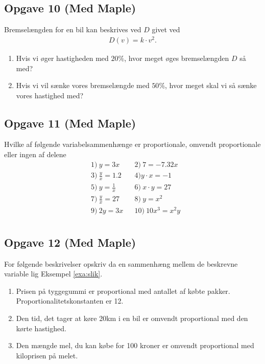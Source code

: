 \subsection*{Opgave 10 (Med Maple)}
Bremselængden for en bil kan beskrives ved $D$ givet ved
\begin{align*}
D(v) = k\cdot v^2.
\end{align*}
\begin{enumerate}[label=\roman*)]
\item Hvis vi øger hastigheden med $20\%$, hvor meget øges bremselængden $D$ så med?
\item Hvis vi vil sænke vores bremselængde med $50\%$, hvor meget skal vi så sænke vores hastighed med?
\end{enumerate}

\subsection*{Opgave 11 (Med Maple)}


Hvilke af følgende variabelsammenhænge er proportionale, omvendt proportionale eller ingen af delene
\begin{align*}
	&1) \ y = 3x   &&2) \  7 = -7.32x \\
	&3) \ \frac{y}{x} = 1.2  &&4) y\cdot x = -1 \\
	&5) \  y = \frac{1}{x} &&6) \  x\cdot y = 27    \\
	&7) \ \frac{y}{x} = 27 &&8) \  y=x^2   \\
	&9) \ 2y = 3x &&10) \ 10x^3 = x^2y    \\
\end{align*}

\subsection*{Opgave 12 (Med Maple)}
For følgende beskrivelser opskriv da en sammenhæng mellem de beskrevne variable lig Eksempel \ref{exa:slik}.
\begin{enumerate}[label=\roman*)]
	\item Prisen på tyggegummi er proportional med antallet af købte pakker. Proportionalitetskonstanten er 12.
	\item Den tid, det tager at køre 20km i en bil er omvendt proportional med den kørte hastighed.
	\item Den mængde mel, du kan købe for 100 kroner er omvendt proportional med kiloprisen på melet. 
\end{enumerate}

